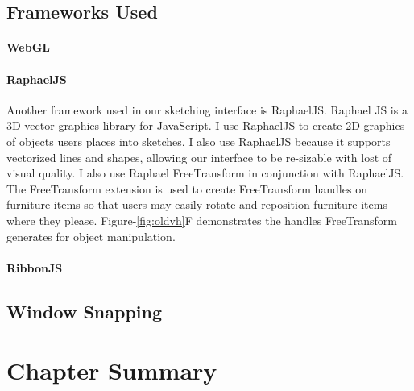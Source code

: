 \subsection{Frameworks Used}
\paragraph{WebGL}
\paragraph{RaphaelJS}
Another framework used in our sketching interface is RaphaelJS\cite{todo}.
Raphael JS is a 3D vector graphics library for JavaScript. 
I use RaphaelJS to create 2D graphics of objects users places into sketches. I also use RaphaelJS because it supports vectorized lines and shapes, allowing our interface  to be re-sizable with lost of visual quality.
I also use Raphael FreeTransform in conjunction with RaphaelJS\cite{todo}. 
The FreeTransform extension is used to create FreeTransform handles on furniture items so that users may easily rotate and reposition furniture items where they please.
Figure-\ref{fig:oldvh}F demonstrates the handles FreeTransform generates for object manipulation.\\


\paragraph{RibbonJS}


\subsection{Window Snapping}

\section{Chapter Summary}

